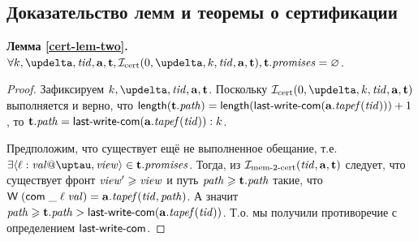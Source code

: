 \subsection{Доказательство лемм и теоремы о сертификации}

\noindent
{\bf Лемма \ref{cert-lem-two}.}
$\forall k, \delta, \tId, \aT, \tT, \invCert(0, \delta, k, \tId, \aT, \tT), \tT.\PromSet = \emptyset$.
\begin{proof}%
  Зафиксируем $k, \delta, \tId, \aT, \tT$.
  Поскольку $\invCert(0, \delta, k, \tId, \aT, \tT)$ выполняется и верно, что 
  $\length(\tT.\cpath) = \length(\lastCommittedWrite(\aT.\tapef(\tId))) + 1$, то
  $\tT.\cpath = \lastCommittedWrite(\aT.\tapef(\tId)):k$.
  
  Предположим, что существует ещё не выполненное обещание,
  т.е. $\exists \writeEvt{\loc}{\stval}{\tau}{\R} \in \tT.\PromSet$.
  Тогда, из $\mathcal{I}_{\textup{\rm mem-2-cert}}(\mathit{tid}, \mathbf{a}, \mathbf{t})$ следует, что
  существует фронт $\mathit{view}' \geqslant \mathit{view}$ и путь $\mathit{path} \geqslant \mathbf{t}.\mathit{path}$ такие, что
  $\textsf{W} \; (\mathsf{com} \; \_ \; \ell \; \mathit{val}) = \mathbf{a}.\mathit{tapef}(\mathit{tid}, \mathit{path})$.
  А значит 
  $\mathit{path} \geqslant \mathbf{t}.\mathit{path} > \textup{\sf last-write-com}(\mathbf{a}.\mathit{tapef}(\mathit{tid}))$.
  Т.о. мы получили противоречие с определением $\textup{\sf last-write-com}$.
\end{proof}


